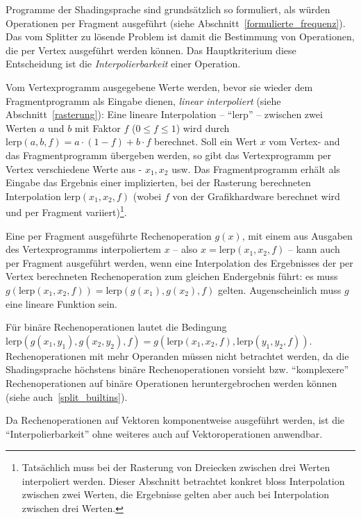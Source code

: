 \documentclass[twoside,a4paper,fleqn,12pt]{book}
\begin{document}
Programme der Shadingsprache sind grundsätzlich so formuliert, als würden Operationen per Fragment ausgeführt (siehe Abschnitt~\ref{formulierte_frequenz}).
Das vom Splitter zu lösende Problem ist damit die Bestimmung von Operationen, die per Vertex ausgeführt werden können.
Das Hauptkriterium diese Entscheidung ist die \emph{Interpolierbarkeit} einer Operation.

\newcommand\lerp{\mathrm{lerp}}
Vom Vertexprogramm ausgegebene Werte werden, bevor sie wieder dem Fragmentprogramm als Eingabe dienen, \emph{linear interpoliert} (siehe Abschnitt~\ref{rasterung}):
Eine lineare Interpolation -- "`$\lerp$"' -- zwischen zwei Werten $a$ und $b$ mit Faktor $f$ ($0 \le f \le 1$) wird durch $\lerp(a, b, f) = a \cdot (1-f) + b \cdot f$ berechnet.
Soll ein Wert $x$ vom Vertex- and das Fragmentprogramm übergeben werden, so gibt das Vertexprogramm per Vertex verschiedene Werte aus - $x_1, x_2$ usw.
Das Fragmentprogramm erhält als Eingabe das Ergebnis einer implizierten, bei der Rasterung berechneten Interpolation $\lerp(x_1, x_2, f)$ (wobei $f$ von der Grafikhardware berechnet wird
und per Fragment variiert)\footnote{Tatsächlich muss bei der Rasterung von Dreiecken zwischen drei Werten interpoliert werden. Dieser Abschnitt betrachtet konkret
bloss Interpolation zwischen zwei Werten, die Ergebnisse gelten aber auch bei Interpolation zwischen drei Werten.}.

Eine per Fragment ausgeführte Rechenoperation $g(x)$, mit einem aus Ausgaben des Vertexprogramms interpoliertem $x$ -- also $x = \lerp(x_1, x_2, f)$ --
kann auch per Fragment ausgeführt werden, wenn eine Interpolation des Ergebnisses der per Vertex berechneten Rechenoperation zum gleichen Endergebnis führt:
es muss $g(\lerp(x_1, x_2, f)) = \lerp (g(x_1), g(x_2), f)$ gelten. Augenscheinlich muss $g$ eine lineare Funktion sein.

Für binäre Rechenoperationen lautet die Bedingung $\lerp (g (x_1, y_1), g (x_2, y_2), f) = g (\lerp (x_1, x_2, f), \lerp (y_1, y_2, f))$.
Rechenoperationen mit mehr Operanden müssen nicht betrachtet werden, da die Shadingsprache höchstens
binäre Rechenoperationen vorsieht bzw. "`komplexere"' Rechenoperationen auf binäre Operationen heruntergebrochen werden
können (siehe auch~\ref{split_builtins}). %

Da Rechenoperationen auf Vektoren komponentweise ausgeführt werden,  ist die "`Interpolierbarkeit"' ohne weiteres auch auf Vektoroperationen anwendbar.
\end{document}
